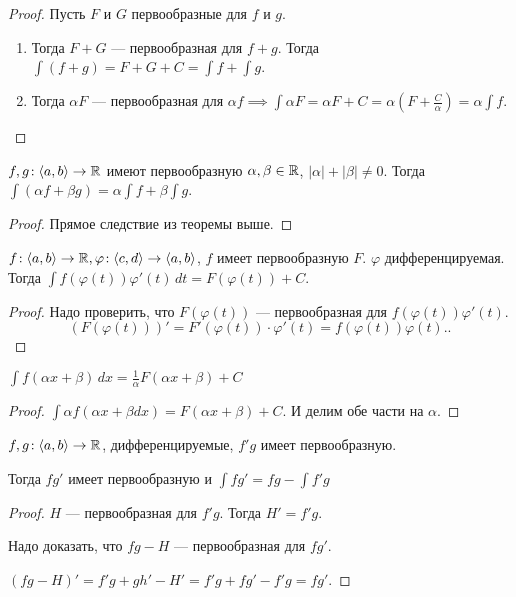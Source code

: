 \begin{proof}
    Пусть $F$ и  $G$ первообразные для  $f$ и  $g$. 
     \begin{enumerate}
         \item Тогда $F+G$ --- первообразная для  $f+g$. Тогда  $\int(f+g) = F+G+C = \int f + \int g$.
         \item Тогда  $\alpha F$ --- первообразная для  $\alpha f \implies \int \alpha F = \alpha F + C = \alpha(F + \frac{C}{\alpha}) = \alpha \int f$.
    \end{enumerate}
\end{proof}
\begin{consequence}
    $f, g\!:\langle a, b\rangle \to \mathbb{R}$ имеют первообразную $\alpha, \beta \in \mathbb{R}$,  $|\alpha| + |\beta| \neq 0$. Тогда  $\int(\alpha f+ \beta g) = \alpha \int f + \beta \int g$. 
\end{consequence}
\begin{proof}
    Прямое следствие из теоремы выше.
\end{proof}
\begin{theorem}
    $f\!: \langle a, b \rangle \to \mathbb{R}, \varphi\!:\langle c, d \rangle \to \langle a, b \rangle$,  $f$ имеет первообразную  $F$.  $\varphi$ дифференцируемая. Тогда  $\int f(\varphi(t)) \varphi'(t)\,dt = F(\varphi(t)) + C$.
\end{theorem}
\begin{proof}
    Надо проверить, что $F(\varphi(t))$ --- первообразная для  $f(\varphi(t))\varphi'(t)$.  \[
        (F(\varphi(t)))' = F'(\varphi(t))\cdot \varphi'(t) = f(\varphi(t))\varphi(t).
    .\] 
\end{proof}
\begin{consequence}
    $\int f(\alpha x + \beta)\,dx = \frac{1}{\alpha}F(\alpha x + \beta)+C$
\end{consequence}
\begin{proof}
    $\int \alpha f(\alpha x + \beta dx) = F(\alpha x + \beta) + C$. И делим обе части на  $\alpha$.
\end{proof}
\begin{theorem}
    $f, g\!: \langle a, b \rangle \to \mathbb{R}$, дифференцируемые,  $f'g$ имеет первообразную.

    Тогда  $fg'$ имеет первообразную и  $\int fg' = fg - \int f'g$
\end{theorem}
\begin{proof}
    $H$ --- первообразная для  $f'g$. Тогда  $H' = f'g$.

    Надо доказать, что  $fg - H$ --- первообразная для $fg'$.

    $(fg - H)' = f'g + gh' - H' = f'g + fg' - f'g = fg'$. 
\end{proof}
